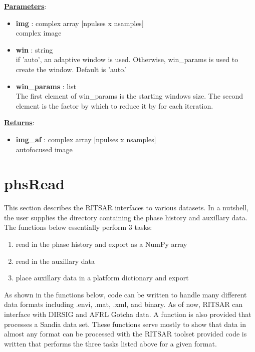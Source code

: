 \documentclass{article}
\newcommand{\defs}[2]{\textbf{{#1}} : {#2}}
\begin{document}
\noindent \underline{\textbf{Parameters}}:

\begin{itemize}
	\item \defs{img}{complex array [npulses x nsamples]}\\
  		complex image
  	\item \defs{win}{string}\\
  		if 'auto', an adaptive window is used.  Otherwise, win\_params is used to create the window.  Default is 'auto.'
  	\item \defs{win\_params}{list}\\
  	  		The first element of win\_params is the starting windows size.  The second element is the factor by which to reduce it by for each iteration.
  	
\end{itemize}

\noindent \underline{\textbf{Returns}}:
\begin{itemize}
	\item \defs{img\_af}{complex array [npulses x nsamples]}\\
	autofocused image
\end{itemize}

\newpage
\section{phsRead}
This section describes the RITSAR interfaces to various datasets.  In a nutshell, the user supplies the directory containing the phase history and auxillary data.  The functions below essentially perform 3 tasks:
\begin{enumerate}
\item read in the phase history and export as a NumPy array
\item read in the auxillary data
\item place auxillary data in a platform dictionary and export
\end{enumerate}
As shown in the functions below, code can be written to handle many different data formats including .envi, .mat, .xml, and binary.  As of now, RITSAR can interface with DIRSIG and AFRL Gotcha data.  A function is also provided that processes a Sandia data set.  These functions serve mostly to show that data in almost any format can be processed with the RITSAR toolset provided code is written that performs the three tasks listed above for a given format.
\end{document}

